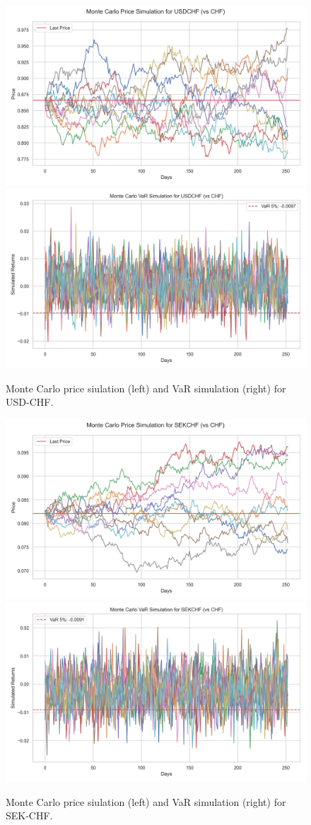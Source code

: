\documentclass{article}
\begin{document}
\begin{figure}[H]
    \centering  \includegraphics[width=0.48\linewidth]{reports/figures/monte_carlo_price_simulation_USDCHF_vs_CHF.png} \label{fig:monte_carlo_price_simulation_USDCHF_vs_CHF}
    \includegraphics[width=0.48\linewidth]{reports/figures/monte_carlo_var_simulation_USDCHF_vs_CHF.png} \label{fig:monte_carlo_var_simulation_USDCHF_vs_CHF}
    \caption{\footnotesize Monte Carlo price siulation (left) and VaR simulation (right) for USD-CHF.}
\end{figure}

\begin{figure}[H]
    \centering  \includegraphics[width=0.48\linewidth]{reports/figures/monte_carlo_price_simulation_SEKCHF_vs_CHF.png} \label{fig:monte_carlo_price_simulation_SEKCHF_vs_CHF}
    \includegraphics[width=0.48\linewidth]{reports/figures/monte_carlo_var_simulation_SEKCHF_vs_CHF.png} \label{fig:monte_carlo_var_simulation_SEKCHF_vs_CHF}
    \caption{\footnotesize Monte Carlo price siulation (left) and VaR simulation (right) for SEK-CHF.}
\end{figure}
\end{document}
